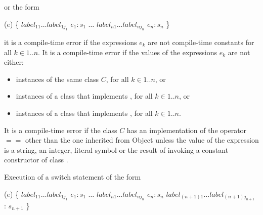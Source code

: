 \documentclass{article}
\newcommand{\code}[1]{{\sf #1}}
\begin{document}
 or the form

\begin{dartCode}
\SWITCH{} ($e$) \{
   $label_{11} \ldots label_{1j_1}$ \CASE{} $e_1: s_1$
   $\ldots$
   $label_{n1} \ldots label_{nj_n}$ \CASE{} $e_n: s_n$
\}
\end{dartCode}

 it is a compile-time error if the expressions $e_k$ are not compile-time constants for all  $k \in 1..n$.  It is a compile-time error if the values of the expressions $e_k$ are not either:
 \begin{itemize}
 \item instances of the same class $C$, for all $k \in 1..n$,  or
 \item instances of a class that implements , for all $k \in 1..n$,  or
 \item instances of a class that implements , for all $k \in 1..n$.
 \end{itemize}


\LMHash{}
It is a compile-time error if the class $C$ has an implementation of the operator $==$ other than the one inherited from \code{Object} unless the value of the expression is a string, an integer, literal symbol or the result of invoking a constant constructor of class .



\LMHash{}
Execution of a switch statement of the form

\begin{dartCode}
\SWITCH{} ($e$) \{
   $label_{11} \ldots label_{1j_1}$ \CASE{} $e_1: s_1$
   $\ldots$
   $label_{n1} \ldots label_{nj_n}$ \CASE{} $e_n: s_n$
   $label_{(n+1)1} \ldots label_{(n+1)j_{n+1}}$ \DEFAULT{}: $s_{n+1}$
\}
\end{dartCode}
\end{document}
